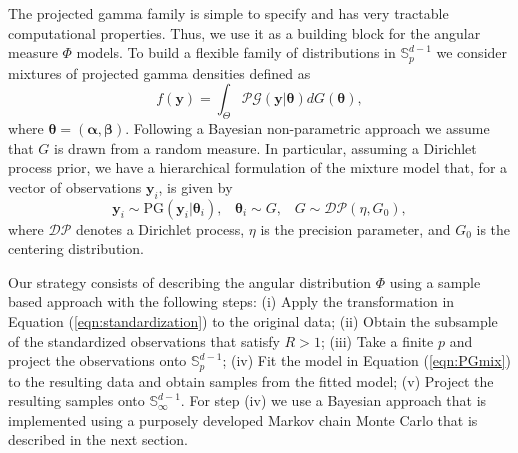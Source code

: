   The projected gamma family is simple to specify and has very tractable computational properties. Thus, we use it as a building block for the angular measure $\Phi$ models. To build a flexible family of distributions in ${\mathbb S}_p^{d-1}$ we consider mixtures of projected gamma densities defined as
  \begin{equation} \label{eqn:PGmix}     
     f(\bm{y}) = \int_\Theta \mathcal{PG}(\bm{y}|\bm{\theta}) dG(\bm{\theta}), 
  \end{equation} 
  where $\bm{\theta} = (\bm{\alpha}, \bm{\beta})$. Following a Bayesian non-parametric approach \citep{Ferguson74,Antoniak1974} we assume that $G$ is drawn from a random measure. In particular, assuming a Dirichlet process prior, we have a hierarchical formulation of the mixture model that, for a vector of observations $\bm{y}_i$, is given by
  \begin{equation}\label{eqn:dppg}    \bm{y}_i \sim \text{PG}(\bm{y}_i|\bm{\theta}_i) , \;\;\; \bm{\theta}_i \sim G, \;\;\; G \sim \mathcal{DP}(\eta, G_0),
  \end{equation}
  where $\mathcal{DP}$ denotes a Dirichlet process, $\eta$ is the precision parameter, and $G_0$ is the centering distribution. 
  
  Our strategy consists of describing the angular distribution $\Phi$ using a sample based approach with the following steps: (i) Apply the transformation in Equation (\ref{eqn:standardization}) to the original data; (ii) Obtain the subsample of the standardized observations that satisfy $R>1$; (iii) Take a finite $p$ and project the observations onto ${\mathbb S}_p^{d-1}$; (iv) Fit the model in Equation (\ref{eqn:PGmix}) to the resulting data and obtain samples from the fitted model; (v) Project the resulting samples onto ${\mathbb S}_\infty^{d-1}$.
  For step (iv) we use a Bayesian approach that is implemented using a purposely developed Markov chain Monte Carlo that is described in the next section.

